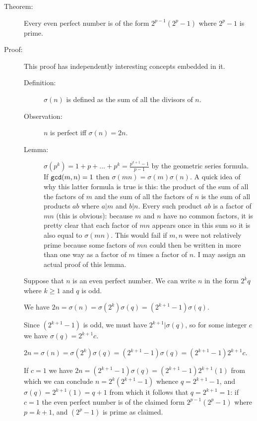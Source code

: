 \documentclass[12pt]{article}
\begin{document}
\begin{description}

\item[Theorem:]   Every even perfect number is of the form $2^{p-1}(2^p-1)$ where $2^p-1$ is prime.

\item[Proof:]

This proof has independently interesting concepts embedded in it.

\begin{description}

\item[Definition:]  $\sigma(n)$ is defined as the sum of all the divisors of $n$.

\item[Observation:]  $n$ is perfect iff $\sigma(n)=2n$.

\item[Lemma:]  $\sigma(p^k)= 1+p+\ldots+p^k = \frac{p^{k+1}-1}{p-1}$ by the geometric series formula.  If ${\tt gcd}(m,n)=1$ then $\sigma(mn)=\sigma(m)\sigma(n)$.   A quick idea of why this latter formula is
true is this:  the product of the sum of all the factors of $m$ and the sum of all the factors of $n$ is the sum of  all products $ab$ where $a|m$ and $b|n$.  Every such product $ab$ is a factor of $mn$ (this is obvious):
because $m$ and $n$ have no common factors, it is pretty clear that each factor of $mn$ appears once in this sum so it is also equal to $\sigma(mn)$.  This would fail if $m, n$ were not relatively prime because some factors of $mn$ could then be written in more than one way as a factor of $m$ times a factor of $n$.   I may assign an actual proof of this lemma.


\end{description}

Suppose that $n$ is an even perfect number.   We can write $n$ in the form $2^kq$ where $k \geq 1$ and $q$ is odd.

We have $2n = \sigma(n)= \sigma(2^k)\sigma(q)= (2^{k+1}-1)\sigma(q)$.

Since $(2^{k+1}-1)$ is odd, we must have $2^{k+1}|\sigma(q)$, so for some integer $c$ we have $\sigma(q)=2^{k+1}c$.


 $2n = \sigma(n)= \sigma(2^k)\sigma(q)= (2^{k+1}-1)\sigma(q) =  (2^{k+1}-1)2^{k+1}c$.

If $c=1$ we have $2n=(2^{k+1}-1)\sigma(q) =  (2^{k+1}-1)2^{k+1}(1)$ from which we can conclude $n=2^k(2^{k+1}-1)$ whence $q=2^{k+1}-1$, and $\sigma(q)=2^{k+1}(1)=q+1$ from which it follows that $q=2^{k+1}=1$:
if $c=1$ the even perfect number is of the claimed form $2^{p-1}(2^p-1)$ where $p=k+1$, and $(2^p-1)$ is prime as claimed.


\end{description}
\end{document}
